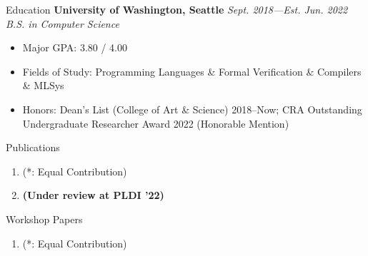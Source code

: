 \documentclass{resume}
\begin{document}
	\begin{rSection}{Education}
	{\bf University of Washington, Seattle} \hfill {\em Sept. 2018---Est. Jun. 2022} \\
	\textit{B.S. in Computer Science}
	\vspace{-5pt}
        \begin{itemize}[leftmargin=*]
            \setlength{\itemsep}{1pt}
            \setlength{\parskip}{0pt}
			\setlength{\parsep}{0pt}
			\item Major GPA: 3.80 / 4.00
            \item Fields of Study: Programming Languages \& Formal Verification \& Compilers \& MLSys
            \item Honors: Dean's List (College of Art \& Science) 2018--Now; CRA Outstanding Undergraduate Researcher Award 2022 (Honorable Mention)
		\end{itemize}
	\end{rSection}
	\vspace{-5pt}
    \begin{rSection}{Publications}
		\begin{enumerate}
			\setlength{\itemsep}{1pt}
            \setlength{\parskip}{0pt}
			\setlength{\parsep}{0pt}
			\item {} (\small{*: Equal Contribution})
			\item \textbf{(Under review at PLDI '22)} 
		\end{enumerate}
        \vspace{-5pt}
	\end{rSection}
	\vspace{1pt}
	\begin{rSection}{Workshop Papers}
		\begin{enumerate}
			\setlength{\itemsep}{1pt}
            \setlength{\parskip}{0pt}
			\setlength{\parsep}{0pt}
			\item {} (\small{*: Equal Contribution})
		\end{enumerate}
        \vspace{-5pt}
	\end{rSection}
    \vspace{1pt}
\end{document}
